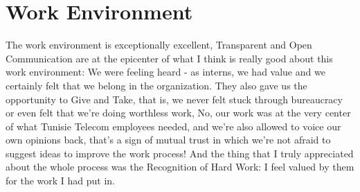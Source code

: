 





\section{Work Environment}
The work environment is exceptionally excellent, Transparent and Open Communication are at the epicenter of what I think is really good about this work environment: We were feeling heard - as interns, we had value and we certainly felt that we belong in the organization. 
They also gave us the opportunity to Give and Take, that is,  we never felt stuck through bureaucracy or even felt that we're doing worthless work, No, our work was at the very center of what Tunisie Telecom employees needed, and we're also allowed to voice our own opinions back, that's a sign of mutual trust in which we're not afraid to suggest ideas to improve the work process! 
And the thing that I truly appreciated about the whole process was the  Recognition of Hard Work: I feel valued by them for the work I had put in.

